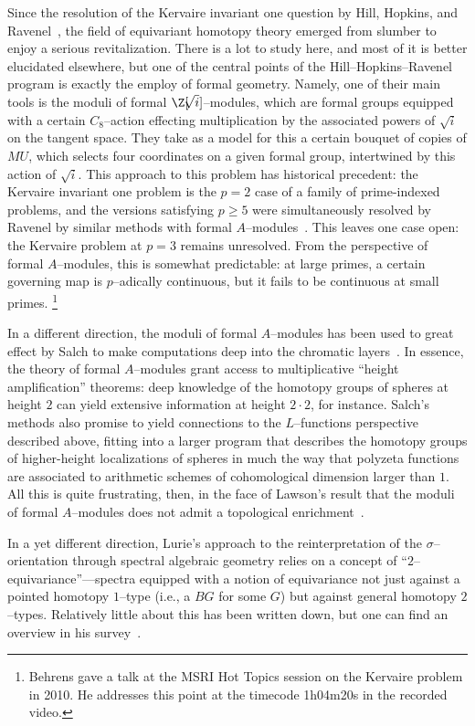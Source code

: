 Since the resolution of the Kervaire invariant one question by Hill, Hopkins, and Ravenel~\cite{HHR}, the field of equivariant homotopy theory emerged from slumber to enjoy a serious revitalization.
There is a lot to study here, and most of it is better elucidated elsewhere, but one of the central points of the Hill--Hopkins--Ravenel program is exactly the employ of formal geometry.
Namely, one of their main tools is the moduli of formal \(\Z[\!\!\sqrt{i}]\)--modules, which are formal groups equipped with a certain \(C_8\)--action effecting multiplication by the associated powers of \(\!\!\sqrt{i}\) on the tangent space.
They take as a model for this a certain bouquet of copies of \(MU\), which selects four coordinates on a given formal group, intertwined by this action of \(\!\!\sqrt{i}\).
This approach to this problem has historical precedent: the Kervaire invariant one problem is the \(p = 2\) case of a family of prime-indexed problems, and the versions satisfying \(p \ge 5\) were simultaneously resolved by Ravenel by similar methods with formal \(A\)--modules~\cite{RavenelNonexistenceArfInvariantElts}.
This leaves one case open: the Kervaire problem at \(p = 3\) remains unresolved.
From the perspective of formal \(A\)--modules, this is somewhat predictable: at large primes, a certain governing map is \(p\)--adically continuous, but it fails to be continuous at small primes.%
\footnote{%
Behrens gave a talk at the MSRI Hot Topics session on the Kervaire problem in 2010.
He addresses this point at the timecode 1h04m20s in the recorded video.
}

In a different direction, the moduli of formal \(A\)--modules has been used to great effect by Salch to make computations deep into the chromatic layers~\cite{Salch}.
In essence, the theory of formal \(A\)--modules grant access to multiplicative ``height amplification'' theorems: deep knowledge of the homotopy groups of spheres at height \(2\) can yield extensive information at height \(2 \cdot 2\), for instance.
Salch's methods also promise to yield connections to the \(L\)--functions perspective described above, fitting into a larger program that describes the homotopy groups of higher-height localizations of spheres in much the way that polyzeta functions are associated to arithmetic schemes of cohomological dimension larger than \(1\).
All this is quite frustrating, then, in the face of Lawson's result that the moduli of formal \(A\)--modules does not admit a topological enrichment~\cite{LawsonRealizability}.

In a yet different direction, Lurie's approach to the reinterpretation of the \(\sigma\)--orientation through spectral algebraic geometry relies on a concept of ``\(2\)--equivariance''---spectra equipped with a notion of equivariance not just against a pointed homotopy \(1\)--type (i.e., a \(BG\) for some \(G\)) but against general homotopy \(2\)--types.
Relatively little about this has been written down, but one can find an overview in his survey~\cite[Section 5.3]{LurieSurveyOfEll}.



